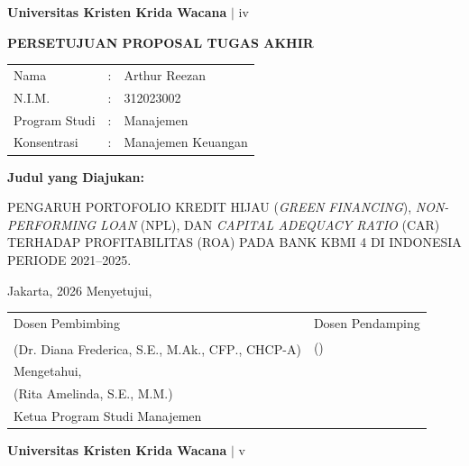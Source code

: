 \documentclass[12pt,a4paper]{article}
\newcommand{\ukrida}{Universitas Kristen Krida Wacana}
\newcommand{\prodi}{Manajemen}
\newcommand{\nahamahasiswa}{Arthur Reezan}
\newcommand{\nim}{312023002}
\newcommand{\dosbim}{Dr. Diana Frederica, S.E., M.Ak., CFP\textsuperscript{\textregistered}., CHCP-A}
\newcommand{\ketprodi}{Rita Amelinda, S.E., M.M.}
\numberwithin{equation}{section}
\begin{document}
\vfill
\begin{flushright}
  \footnotesize\textbf{\ukrida} $|$ iv
\end{flushright}

\newpage
\thispagestyle{frontmatter}
\begin{center}
  {\large\bfseries PERSETUJUAN PROPOSAL TUGAS AKHIR}
\end{center}

\vspace{0.8cm}
\noindent
\begin{tabular}{lll}
  Nama          & : & \nahamahasiswa \\
  N.I.M.        & : & \nim \\
  Program Studi & : & \prodi \\
  Konsentrasi   & : & Manajemen Keuangan \\
\end{tabular}

\vspace{0.5cm}
\noindent \textbf{Judul yang Diajukan:}

\vspace{0.3cm}
\noindent PENGARUH PORTOFOLIO KREDIT HIJAU (\emph{GREEN FINANCING}),
\emph{NON-PERFORMING LOAN} (NPL), DAN \emph{CAPITAL ADEQUACY RATIO} (CAR)
TERHADAP PROFITABILITAS (ROA) PADA BANK KBMI 4 DI INDONESIA PERIODE 2021--2025.

\vspace{1cm}
\noindent Jakarta, \underline{\hspace{3cm}} 2026 \hfill Menyetujui,

\vspace{0.5cm}
\noindent
\begin{tabular}{p{6cm} p{6cm}}
  Dosen Pembimbing & Dosen Pendamping \\[2.5cm]
  (\dosbim) & (\underline{\hspace{4cm}}) \\[0.8cm]
  \multicolumn{2}{l}{Mengetahui,} \\[0.4cm]
  \multicolumn{2}{l}{(\ketprodi)} \\
  \multicolumn{2}{l}{Ketua Program Studi Manajemen} \\
\end{tabular}

\vfill
\begin{flushright}
  \footnotesize\textbf{\ukrida} $|$ v
\end{flushright}
\end{document}
